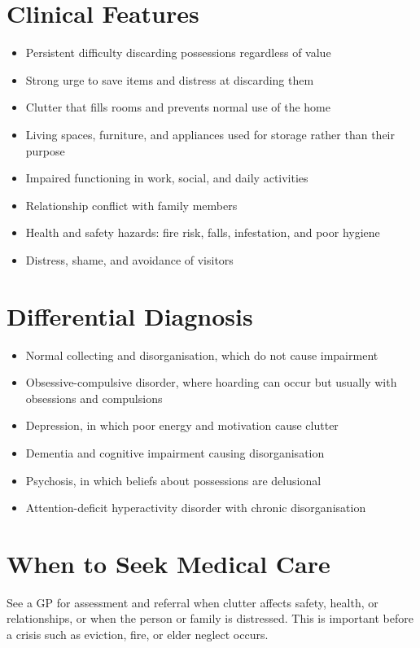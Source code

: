 \section*{Clinical Features}
\begin{itemize}
    \item Persistent difficulty discarding possessions regardless of value
    \item Strong urge to save items and distress at discarding them
    \item Clutter that fills rooms and prevents normal use of the home
    \item Living spaces, furniture, and appliances used for storage rather than their purpose
    \item Impaired functioning in work, social, and daily activities
    \item Relationship conflict with family members
    \item Health and safety hazards: fire risk, falls, infestation, and poor hygiene
    \item Distress, shame, and avoidance of visitors
\end{itemize}

\section*{Differential Diagnosis}
\begin{itemize}
    \item Normal collecting and disorganisation, which do not cause impairment
    \item Obsessive-compulsive disorder, where hoarding can occur but usually with obsessions and compulsions
    \item Depression, in which poor energy and motivation cause clutter
    \item Dementia and cognitive impairment causing disorganisation
    \item Psychosis, in which beliefs about possessions are delusional
    \item Attention-deficit hyperactivity disorder with chronic disorganisation
\end{itemize}

\section*{When to Seek Medical Care}
See a GP for assessment and referral when clutter affects safety, health, or relationships, or when the person or family is distressed. This is important before a crisis such as eviction, fire, or elder neglect occurs.

